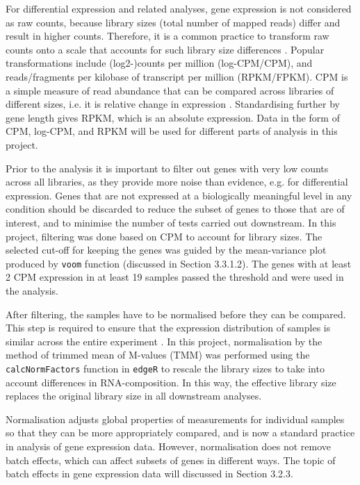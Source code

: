     For differential expression and related analyses, gene expression is not considered as raw counts, because library sizes (total number of mapped reads) differ and result in higher counts. Therefore, it is a common practice to transform raw counts onto a scale that accounts for such library size differences \cite{law2016rna}. Popular transformations include (log2-)counts per million (log-CPM/CPM), and reads/fragments per kilobase of transcript per million (RPKM/FPKM). CPM is a simple measure of read abundance that can be compared across libraries of different sizes, i.e. it is relative change in expression \cite{Law2014}. Standardising further by gene length gives RPKM, which is an absolute expression. Data in the form of CPM, log-CPM, and RPKM will be used for different parts of analysis in this project. 
    
    Prior to the analysis it is important to filter out genes with very low counts across all libraries, as they provide more noise than evidence, e.g. for differential expression. Genes that are not expressed at a biologically meaningful level in any condition should be discarded to reduce the subset of genes to those that are of interest, and to minimise the number of tests carried out downstream. In this project, filtering was done based on CPM to account for library sizes. The selected cut-off for keeping the genes was guided by the mean-variance plot produced by \texttt{voom} function (discussed in Section 3.3.1.2). The genes with at least 2 CPM expression in at least 19 samples passed the threshold and were used in the analysis.
    
    After filtering, the samples have to be normalised before they can be compared. This step is required to ensure that the expression distribution of samples is similar across the entire experiment \cite{Robinson2010}. In this project, normalisation by the method of trimmed mean of M-values (TMM) \cite{RobinsonAData} was performed using the \texttt{calcNormFactors} function in \texttt{edgeR} to rescale the library sizes to take into account differences in RNA-composition. In this way, the effective library size replaces the original library size in all downstream analyses. 
    
    Normalisation adjusts global properties of measurements for individual samples so that they can be more appropriately compared, and is now a standard practice in analysis of gene expression data. However, normalisation does not remove batch effects, which can affect subsets of genes in different ways. The topic of batch effects in gene expression data will discussed in Section 3.2.3. 

